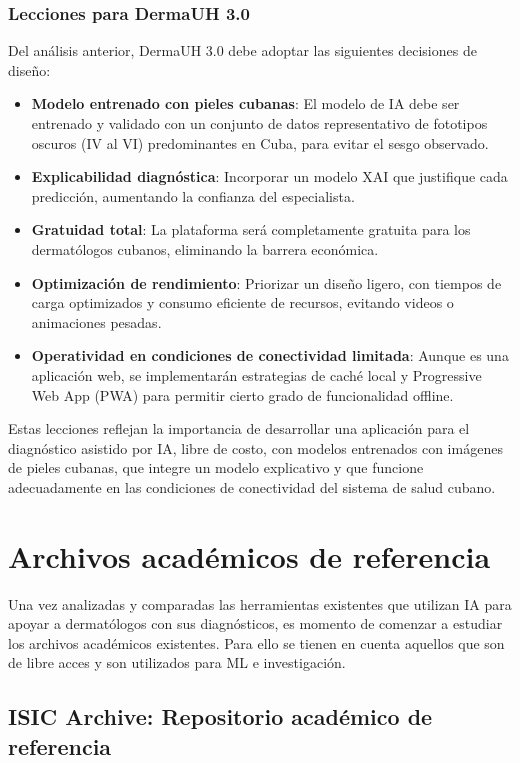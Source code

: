 \subsubsection*{Lecciones para DermaUH 3.0}

Del análisis anterior, DermaUH 3.0 debe adoptar las siguientes decisiones de diseño:

\begin{itemize}
    \item \textbf{Modelo entrenado con pieles cubanas}: El modelo de IA debe ser entrenado y validado con un conjunto de datos representativo de fototipos oscuros (IV al VI) predominantes en Cuba, para evitar el sesgo observado.
    \item \textbf{Explicabilidad diagnóstica}: Incorporar un modelo XAI que justifique cada predicción, aumentando la confianza del especialista.
    \item \textbf{Gratuidad total}: La plataforma será completamente gratuita para los dermatólogos cubanos, eliminando la barrera económica.
    \item \textbf{Optimización de rendimiento}: Priorizar un diseño ligero, con tiempos de carga optimizados y consumo eficiente de recursos, evitando videos o animaciones pesadas.
    \item \textbf{Operatividad en condiciones de conectividad limitada}: Aunque es una aplicación web, se implementarán estrategias de caché local y Progressive Web App (PWA) para permitir cierto grado de funcionalidad offline.
\end{itemize}

Estas lecciones reflejan la importancia de desarrollar una aplicación para el diagnóstico 
asistido por IA, libre de costo, con modelos entrenados con imágenes de pieles cubanas, 
que integre un modelo explicativo y que funcione adecuadamente en las condiciones de 
conectividad del sistema de salud cubano.

\section{Archivos acad\'emicos de referencia}
Una vez analizadas y comparadas las herramientas existentes que utilizan IA para apoyar a dermat\'ologos
con sus diagn\'osticos, es momento de comenzar a estudiar los archivos acad\'emicos existentes. Para ello
se tienen en cuenta aquellos que son de libre acces y son utilizados para ML e investigaci\'on. 

\subsection{ISIC Archive: Repositorio académico de referencia}

